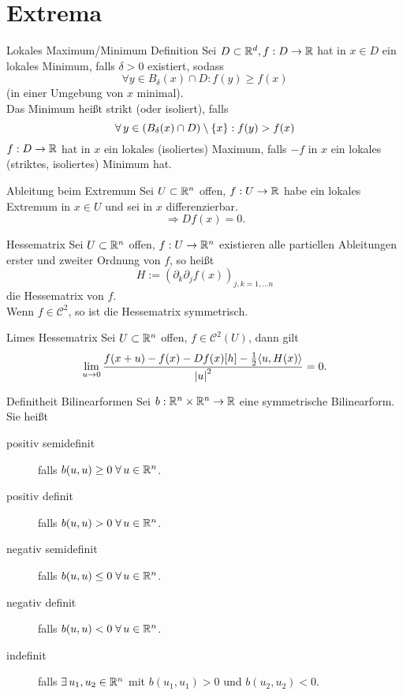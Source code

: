 \documentclass[main.tex]{subfiles}
\begin{document}
\section*{Extrema}

\begin{karte}{Lokales Maximum/Minimum Definition}
    Sei \(D \subset \mathbb{R}^d, f : D \rightarrow \mathbb{R}\) hat in \(x \in D\)
    ein lokales Minimum, falls \(\delta > 0\) existiert, sodass
    \[ \forall y \in B_\delta(x) \cap D: f(y) \geq f(x) \]
    (in einer Umgebung von \(x\) minimal). \\
    Das Minimum heißt strikt (oder isoliert), falls 
    \[ \forall y \in (B_\delta(x) \cap D) \setminus \set{x}: f(y) > f(x) \]
    \( f : D \rightarrow \mathbb{R} \) hat in \(x\) ein lokales (isoliertes) Maximum,
    falls \(-f\) in \(x\) ein lokales (striktes, isoliertes) Minimum hat.
\end{karte}

\begin{karte}{Ableitung beim Extremum}
    Sei \(U\subset \mathbb{R}^n\) offen, \(f : U \rightarrow \mathbb{R}\) habe ein lokales Extremum
    in \(x \in U\) und sei in \(x\) differenzierbar.
    \[ \Rightarrow Df(x) = 0. \]
\end{karte}

\begin{karte}{Hessematrix}
    Sei \( U \subset \mathbb{R}^n \) offen, 
    \( f : U \rightarrow \mathbb{R}^n \) existieren alle 
    partiellen Ableitungen erster und zweiter 
    Ordnung von \(f\), so heißt 
    \[ H := ( \partial_k \partial_j f(x) )_{j,k=1,\ldots n} \]
    die Hessematrix von \(f\).\\
    Wenn \(f \in \mathcal{C}^2\), so ist die Hessematrix 
    symmetrisch.
\end{karte}

\begin{karte}{Limes Hessematrix}
    Sei \(U \subset \mathbb{R}^n\) offen, \(f \in \mathcal{C}^2(U)\), 
    dann gilt
    \[ \lim\limits_{u\rightarrow 0} \frac{f(x+u) - f(x) - Df(x)[h] - \frac{1}{2} 
    \langle u, H(x) \rangle}{\left| u \right|^2} = 0. \]
\end{karte}

\begin{karte}{Definitheit Bilinearformen}
    Sei \( b : \mathbb{R}^n\times \mathbb{R}^n \rightarrow \mathbb{R} \) eine 
    symmetrische Bilinearform. Sie heißt 
    \begin{description}
        \item[positiv semidefinit] falls 
        \( b(u,u) \geq 0 \;\forall u\in \R^n \).
        \item[positiv definit] falls 
        \( b(u,u) > 0 \;\forall u\in \R^n \).
        \item[negativ semidefinit] falls 
        \( b(u,u) \leq 0 \;\forall u\in \R^n \).
        \item[negativ definit] falls 
        \( b(u,u) < 0 \;\forall u\in \R^n \).
        \item[indefinit] falls \( \exists u_1, u_2\in \R^n \) 
        mit \( b(u_1, u_1) > 0 \) und \( b(u_2, u_2) < 0 \).
    \end{description}
\end{karte}
\end{document}
